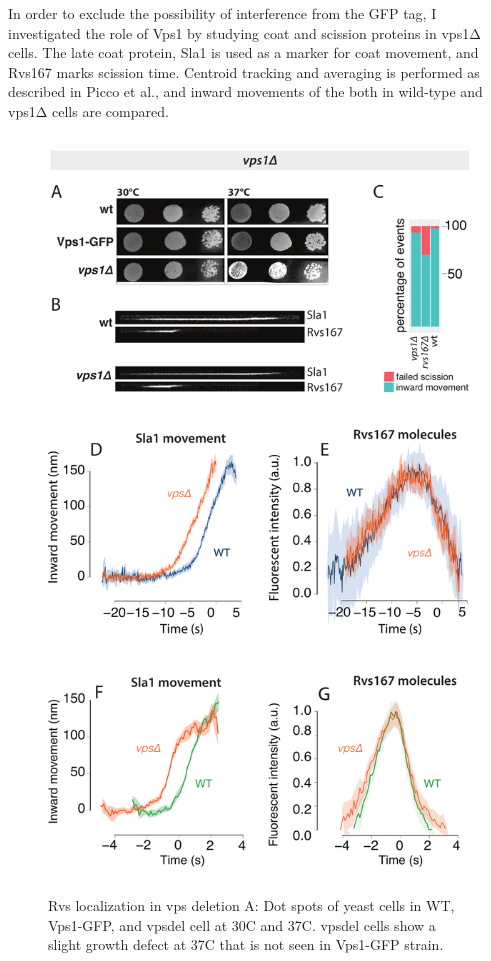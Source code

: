 	\vspace{5mm}
	In order to exclude the possibility of interference from the GFP tag, I investigated the role of Vps1 by studying coat and scission proteins in vps1Δ cells. The late coat protein, Sla1 is used as a marker for coat movement, and Rvs167 marks scission time. Centroid tracking and averaging is performed as described in Picco et al., and inward movements of the both in wild-type and vps1Δ cells are compared. 

	\begin{figure}
	\centering
	\includegraphics[width=20cm,height=20cm,keepaspectratio]{figures/results_final/vps}
	\caption{Rvs localization in vps deletion
	{A: Dot spots of yeast cells in WT, Vps1-GFP, and vpsdel cell at 30C and 37C. vpsdel cells show a slight growth defect at 37C that is not seen in Vps1-GFP strain. 
}}
\end{figure}
